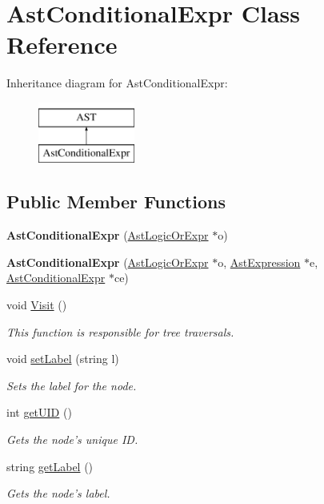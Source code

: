 \hypertarget{classAstConditionalExpr}{\section{Ast\-Conditional\-Expr Class Reference}
\label{classAstConditionalExpr}
}
Inheritance diagram for Ast\-Conditional\-Expr\-:\begin{figure}[H]
\begin{center}
\leavevmode
\includegraphics[height=2.000000cm]{classAstConditionalExpr}
\end{center}
\end{figure}
\subsection*{Public Member Functions}
\begin{DoxyCompactItemize}
\item 
\hypertarget{classAstConditionalExpr_a4adcfd01b6eb5f4fb693e085a27953ee}{{\bfseries Ast\-Conditional\-Expr} (\hyperlink{classAstLogicOrExpr}{Ast\-Logic\-Or\-Expr} $\ast$o)}\label{classAstConditionalExpr_a4adcfd01b6eb5f4fb693e085a27953ee}

\item 
\hypertarget{classAstConditionalExpr_aa65a02af9e4ccd958607efcdabdc195f}{{\bfseries Ast\-Conditional\-Expr} (\hyperlink{classAstLogicOrExpr}{Ast\-Logic\-Or\-Expr} $\ast$o, \hyperlink{classAstExpression}{Ast\-Expression} $\ast$e, \hyperlink{classAstConditionalExpr}{Ast\-Conditional\-Expr} $\ast$ce)}\label{classAstConditionalExpr_aa65a02af9e4ccd958607efcdabdc195f}

\item 
void \hyperlink{classAstConditionalExpr_af62c2b118fd6064ec838435ffa72f48c}{Visit} ()
\begin{DoxyCompactList}\small\item\em This function is responsible for tree traversals. \end{DoxyCompactList}\item 
void \hyperlink{classAST_a71d680856e95ff89f55d5311a552eba6}{set\-Label} (string l)
\begin{DoxyCompactList}\small\item\em Sets the label for the node. \end{DoxyCompactList}\item 
int \hyperlink{classAST_ab7a5b1d9f1c2de0d98deb356f724a42c}{get\-U\-I\-D} ()
\begin{DoxyCompactList}\small\item\em Gets the node's unique I\-D. \end{DoxyCompactList}\item 
string \hyperlink{classAST_aee029be902fffc927d16ccb03eb922ad}{get\-Label} ()
\begin{DoxyCompactList}\small\item\em Gets the node's label. \end{DoxyCompactList}\end{DoxyCompactItemize}
